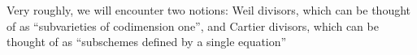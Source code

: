 Very roughly, we will encounter two notions: Weil divisors, which can be thought of as
\enquote{subvarieties of codimension one}, and Cartier divisors, which can be thought of as
\enquote{subschemes defined by a single equation}
